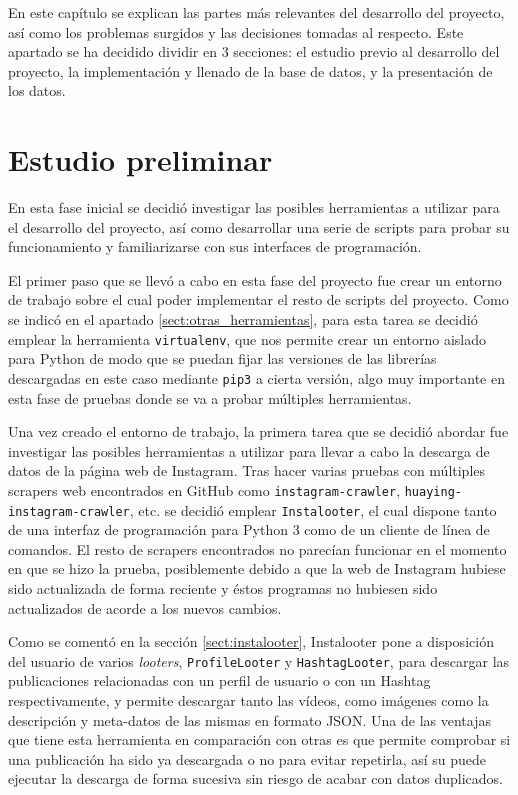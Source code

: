 
En este capítulo se explican las partes más relevantes del desarrollo del proyecto, así como los problemas surgidos y las decisiones tomadas al respecto. Este apartado se ha decidido dividir en 3 secciones: el estudio previo al desarrollo del proyecto, la implementación y llenado de la base de datos, y la presentación de los datos.

\section{Estudio preliminar}
\label{sect:estudio_preliminar}

En esta fase inicial se decidió investigar las posibles herramientas a utilizar para el desarrollo del proyecto, así como desarrollar una serie de scripts para probar su funcionamiento y familiarizarse con sus interfaces de programación.

El primer paso que se llevó a cabo en esta fase del proyecto fue crear un entorno de trabajo sobre el cual poder implementar el resto de scripts del proyecto. Como se indicó en el apartado \ref{sect:otras_herramientas}, para esta tarea se decidió emplear la herramienta \texttt{virtualenv}, que nos permite crear un entorno aislado para Python de modo que se puedan fijar las versiones de las librerías descargadas en este caso mediante \texttt{pip3} a cierta versión, algo muy importante en esta fase de pruebas donde se va a probar múltiples herramientas.

Una vez creado el entorno de trabajo, la primera tarea que se decidió abordar fue investigar las posibles herramientas a utilizar para llevar a cabo la descarga de datos de la página web de Instagram. Tras hacer varias pruebas con múltiples scrapers web encontrados en GitHub como \texttt{instagram-crawler}, \texttt{huaying-instagram-crawler}, etc. se decidió emplear \texttt{Instalooter}, el cual dispone tanto de una interfaz de programación para Python 3 como de un cliente de línea de comandos. El resto de scrapers encontrados no parecían funcionar en el momento en que se hizo la prueba, posiblemente debido a que la web de Instagram hubiese sido actualizada de forma reciente y éstos programas no hubiesen sido actualizados de acorde a los nuevos cambios.

Como se comentó en la sección \ref{sect:instalooter}, Instalooter pone a disposición del usuario de varios \textit{looters}, \texttt{ProfileLooter} y \texttt{HashtagLooter}, para descargar las publicaciones relacionadas con un perfil de usuario o con un Hashtag respectivamente, y permite descargar tanto las vídeos, como imágenes como la descripción y meta-datos de las mismas en formato JSON. Una de las ventajas que tiene esta herramienta en comparación con otras es que permite comprobar si una publicación ha sido ya descargada o no para evitar repetirla, así su puede ejecutar la descarga de forma sucesiva sin riesgo de acabar con datos duplicados.


